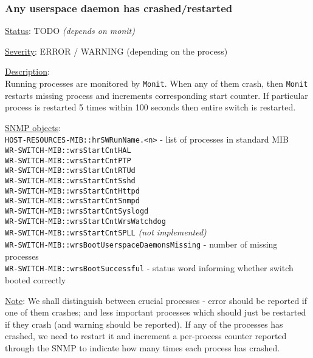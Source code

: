 \subsubsection{\bf Any userspace daemon has crashed/restarted}
		\label{fail:other:daemon_crash}
		\begin{packed_enum}
			\item [] \underline{Status}: TODO \emph{(depends on monit)}
			\item [] \underline{Severity}: ERROR / WARNING (depending on the process)
			\item [] \underline{Description}:\\
				Running processes are monitored by \texttt{Monit}. When any of them crash,
				then \texttt{Monit} restarts missing process and increments corresponding
				start counter. If particular process is restarted 5 times within 100 seconds
				then entire switch is restarted.
			\item [] \underline{SNMP objects}:\\
				\texttt{HOST-RESOURCES-MIB::hrSWRunName.<n>} - list of processes in standard MIB\\
				\texttt{WR-SWITCH-MIB::wrsStartCntHAL}\\
				\texttt{WR-SWITCH-MIB::wrsStartCntPTP}\\
				\texttt{WR-SWITCH-MIB::wrsStartCntRTUd}\\
				\texttt{WR-SWITCH-MIB::wrsStartCntSshd}\\
				\texttt{WR-SWITCH-MIB::wrsStartCntHttpd}\\
				\texttt{WR-SWITCH-MIB::wrsStartCntSnmpd}\\
				\texttt{WR-SWITCH-MIB::wrsStartCntSyslogd}\\
				\texttt{WR-SWITCH-MIB::wrsStartCntWrsWatchdog}\\
				\texttt{WR-SWITCH-MIB::wrsStartCntSPLL} \emph{(not implemented)}\\
				\texttt{WR-SWITCH-MIB::wrsBootUserspaceDaemonsMissing} - number of missing processes\\
				\texttt{WR-SWITCH-MIB::wrsBootSuccessful} - status word informing whether switch booted correctly
			\item [] \underline{Note}: We shall distinguish between crucial
				processes - error should be reported if one of them crashes; and less
				important processes which should just be restarted if they crash (and
				warning should be reported). If any of the processes has crashed, we
				need to restart it and increment a per-process counter reported through
				the SNMP to indicate how many times each process has crashed.\\


\end{packed_enum}
